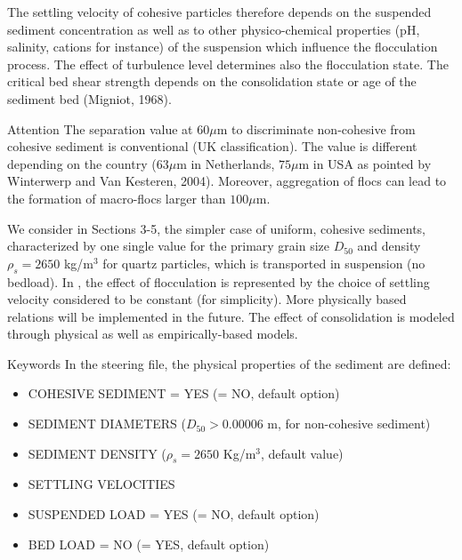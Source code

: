 The settling velocity of cohesive particles therefore depends on the
suspended sediment concentration as well as to other physico-chemical
properties (pH, salinity, cations for instance) of the suspension which
influence the flocculation process. The effect of turbulence level
determines also the flocculation state. The critical bed shear strength
depends on the consolidation state or age of the sediment bed (Migniot,
1968).

\begin{bclogo}[couleur = blue!10, arrondi = 0.10, logo = \bcattention]{\textsf{Attention}}
The separation value at $60\mu$m to discriminate non-cohesive from
cohesive sediment is conventional (UK classification). The value is
different depending on the country ($63\mu$m in Netherlands, $75\mu$m in USA
as pointed by Winterwerp and Van Kesteren, 2004). Moreover, aggregation of
flocs can lead to the formation of macro-flocs larger than $100\mu$m.
\end{bclogo}

We consider in Sections 3-5, the simpler case of uniform, cohesive sediments,
characterized by one single value for the primary grain size $D_{50}$ and
density $\rho_s=2650$ kg/m$^{3}$ for quartz particles, which is
transported in suspension (no bedload). In \sisyphe, the effect of
flocculation is represented by the choice of settling velocity considered to
be constant (for simplicity). More physically based relations will be
implemented in the future. The effect of consolidation is modeled through
physical as well as empirically-based models.

\medskip
\begin{bclogo}[couleur=blue!10,arrondi=0.1, logo=\bcinfo]{Keywords}
In the \sisyphe steering file, the physical properties of the sediment are
defined:
\begin{itemize}
\item {\ttfamily COHESIVE SEDIMENT = YES} ({\ttfamily = NO}, default option)
\item {\ttfamily SEDIMENT DIAMETERS} ($D_{50} > 0.00006$ m, for non-cohesive sediment)
\item {\ttfamily SEDIMENT DENSITY} ($\rho_s = 2650$ Kg/m$^3$, default value)
\item {\ttfamily SETTLING VELOCITIES}
\item {\ttfamily SUSPENDED LOAD = YES} ({\ttfamily = NO}, default option)
\item {\ttfamily BED LOAD = NO} ({\ttfamily = YES}, default option)
\end{itemize}
\end{bclogo}

